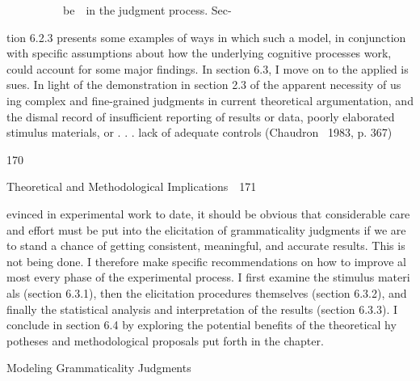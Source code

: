 \begin{styleTextbody}
  [Warning: Image ignored] %
  \ \ \ \ \ \ \ \ \ \ be\ \ in the judgment process. Sec-
\end{styleTextbody}


\begin{styleTextbody}
tion 6.2.3 presents some examples of ways in which such a model, in conjunction with specific assumptions about how the underlying cognitive processes work, could account for some major findings. In section 6.3, I move on to the applied is\- sues. In light of the demonstration in section 2.3 of the apparent necessity of us\- ing complex and fine-grained judgments in current theoretical argumentation, and the dismal record of {\textquotedbl}insufficient reporting of results or data, poorly elaborated stimulus materials, or . . . lack of adequate controls{\textquotedbl} (Chaudron \ 1983, p. 367)
\end{styleTextbody}


\begin{styleStandard}
170
\end{styleStandard}


\clearpage\setcounter{page}{1}\begin{styleStandard}
Theoretical and Methodological Implications\ \ 171
\end{styleStandard}


\begin{styleStandard}
evinced in experimental work to date, it should be obvious that considerable care and effort must be put into the elicitation of grammaticality judgments if we are to stand a chance of getting consistent, meaningful, and accurate results. This is not being done. I therefore make specific recommendations on how to improve al\- most every phase of the experimental process. I first examine the stimulus materi\- als (section 6.3.1), then the elicitation procedures themselves (section 6.3.2), and finally the statistical analysis and interpretation of the results (section 6.3.3). I conclude in section 6.4 by exploring the potential benefits of the theoretical hy\- potheses and methodological proposals put forth in the chapter.
\end{styleStandard}


\begin{styleHeadingvii}
Modeling Grammaticality Judgments
\end{styleHeadingvii}


